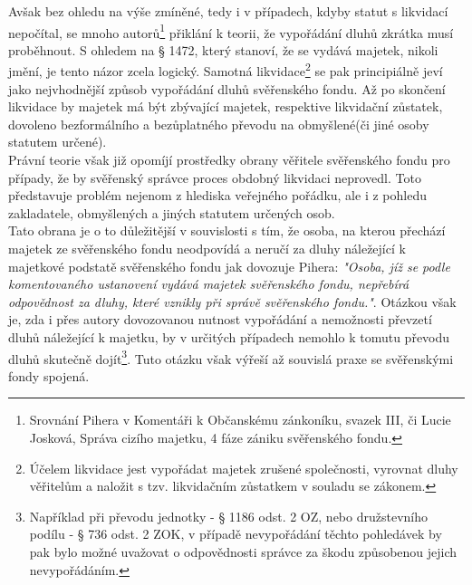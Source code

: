 \documentclass{article}
\begin{document}

Avšak bez ohledu na výše zmíněné, tedy i v případech, kdyby statut s likvidací nepočítal, se mnoho autorů\footnote{Srovnání Pihera v Komentáři k Občanskému zánkoníku, svazek III, či Lucie Josková, Správa cizího majetku, 4 fáze zániku svěřenského fondu.} přiklání k teorii, že vypořádání dluhů zkrátka musí proběhnout. S ohledem na § 1472, který stanoví, že se vydává majetek, nikoli jmění, je tento názor zcela logický. Samotná likvidace\footnote{Účelem likvidace jest vypořádat majetek zrušené společnosti, vyrovnat dluhy věřitelům a naložit s tzv. likvidačním zůstatkem v souladu se zákonem.} se pak principiálně jeví jako nejvhodnější způsob vypořádání dluhů svěřenského fondu. Až po skončení likvidace by majetek má být zbývající majetek, respektive likvidační zůstatek, dovoleno bezformálního a bezůplatného převodu na obmyšlené(či jiné osoby statutem určené).\\

Právní teorie však již opomíjí prostředky obrany věřitele svěřenského fondu pro případy, že by svěřenský správce proces obdobný likvidaci neprovedl. Toto představuje problém nejenom z hlediska veřejného pořádku, ale i z pohledu zakladatele, obmyšlených a jiných statutem určených osob.\\

Tato obrana je o to důležitější v souvislosti s tím, že osoba, na kterou přechází majetek ze svěřenského fondu neodpovídá a neručí za dluhy náležející k majetkové podstatě svěřenského fondu jak dovozuje Pihera: \textit{"Osoba, jíž se podle komentovaného ustanovení vydává majetek svěřenského fondu, nepřebírá odpovědnost za dluhy, které vznikly při správě svěřenského fondu."}. Otázkou však je, zda i přes autory dovozovanou nutnost vypořádání a nemožnosti převzetí dluhů náležející k majetku, by v určitých případech nemohlo k tomutu převodu dluhů skutečně dojít\footnote{Například při převodu jednotky - § 1186 odst. 2 OZ, nebo družstevního podílu - § 736 odst. 2 ZOK, v případě nevypořádání těchto pohledávek by pak bylo možné uvažovat o odpovědnosti správce za škodu způsobenou jejich nevypořádáním.}. Tuto otázku však výřeší až souvislá praxe se svěřenskými fondy spojená.\\
\end{document}
